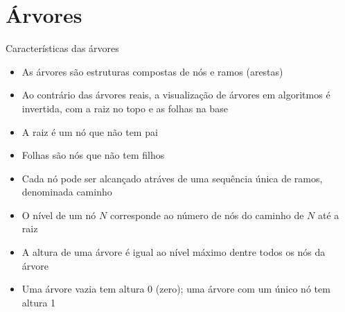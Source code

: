 \section{Árvores}

\begin{frame}[fragile]{Características das árvores}

    \begin{itemize}
        \item As {árvores} são estruturas compostas de {nós} e {ramos} (arestas)

        \item Ao contrário das árvores reais, a visualização de árvores em algoritmos é 
            {invertida}, com a {raiz} no topo e as {folhas} na base
        
        \item A {raiz} é um nó que {não tem} pai
        
        \item {Folhas} são nós {que não} tem filhos

        \item Cada nó pode ser alcançado atráves de uma sequência {única}
            de ramos, denominada {caminho}
        

        \item O {nível} de um nó $N$ corresponde ao número de nós do caminho de $N$ até a  raiz 

        \item A {altura} de uma árvore é igual ao {nível máximo} dentre todos os nós da árvore

        \item Uma árvore {vazia} tem altura 0 (zero); uma árvore com {um único} nó tem altura 1

    \end{itemize}

\end{frame}  

